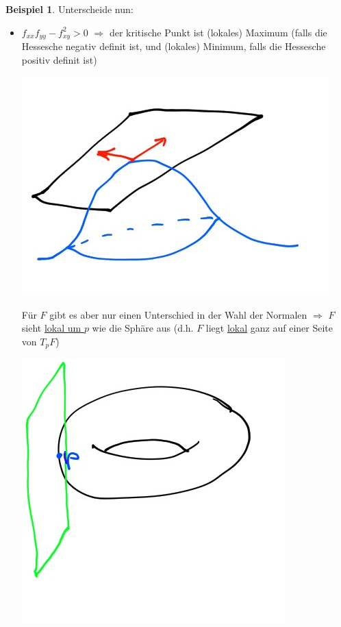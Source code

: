 \documentclass[a4paper,11pt,notitlepage]{report}
\theoremstyle{definition}
\newtheorem{example}{Beispiel}[chapter]
\begin{document}
\begin{example}
	Unterscheide nun:
	\begin{itemize}
		\item $f_{xx} f_{yy} - f_{xy}^2 > 0$ $\Rightarrow$ der kritische Punkt ist (lokales) Maximum (falls die Hessesche negativ definit ist, und (lokales) Minimum, falls die Hessesche positiv definit ist)
		\begin{center}
			\includegraphics[scale=0.4]{images/2012_01_26_Bild4.jpg}
		\end{center}
		
		Für $F$ gibt es aber nur einen Unterschied in der Wahl der Normalen
		\newline
		$\Rightarrow$ $F$ sieht \underline{lokal um $p$} wie die Sphäre aus (d.h. $F$ liegt \underline{lokal} ganz auf einer Seite von $T_p F$)
		\begin{center}
			\includegraphics[scale=0.4]{images/2012_01_26_Bild5.jpg}
		\end{center}
	

\end{itemize}
\end{example}
\end{document}
